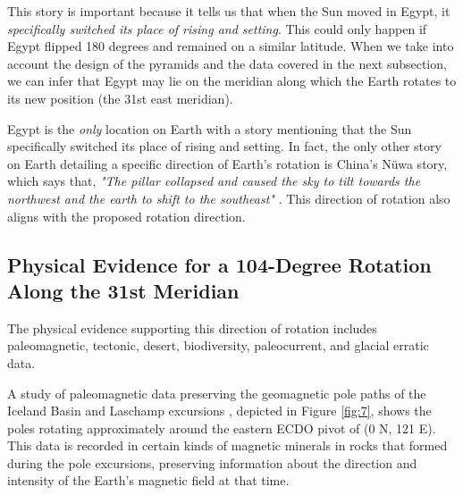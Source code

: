 \documentclass[10pt,twocolumn,letterpaper]{article}
\begin{document}
This story is important because it tells us that when the Sun moved in Egypt, it \textit{specifically switched its place of rising and setting}. This could only happen if Egypt flipped 180 degrees and remained on a similar latitude. When we take into account the design of the pyramids and the data covered in the next subsection, we can infer that Egypt may lie on the meridian along which the Earth rotates to its new position (the 31st east meridian).

Egypt is the \textit{only} location on Earth with a story mentioning that the Sun specifically switched its place of rising and setting. In fact, the only other story on Earth detailing a specific direction of Earth's rotation is China's Nüwa story, which says that, \textit{"The pillar collapsed and caused the sky to tilt towards the northwest and the earth to shift to the southeast"} \cite{8}. This direction of rotation also aligns with the proposed rotation direction.

\subsection{Physical Evidence for a 104-Degree Rotation Along the 31st Meridian}

The physical evidence supporting this direction of rotation includes paleomagnetic, tectonic, desert,  biodiversity, paleocurrent, and glacial erratic data.

A study of paleomagnetic data preserving the geomagnetic pole paths of the Iceland Basin and Laschamp excursions \cite{35}, depicted in Figure \ref{fig:7}, shows the poles rotating approximately around the eastern ECDO pivot of (0 N, 121 E). This data is recorded in certain kinds of magnetic minerals in rocks that formed during the pole excursions, preserving information about the direction and intensity of the Earth's magnetic field at that time.
\end{document}
